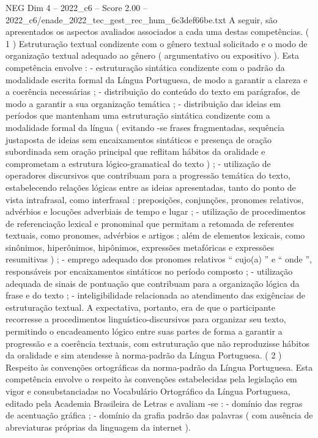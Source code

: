\begin{textsample}{NEG Dim 4 – 2022\_c6 – Score 2.00 – 2022\_c6/enade\_2022\_tec\_gest\_rec\_hum\_6c3def66be.txt}
A seguir, são apresentados os aspectos avaliados associados a cada uma destas competências. ( 1 ) Estruturação textual condizente com o gênero textual solicitado e o modo de organização textual adequado ao gênero ( argumentativo ou expositivo ).
Esta competência envolve : - estruturação sintática condizente com o padrão da modalidade escrita formal da Língua Portuguesa, de modo a garantir a clareza e a coerência necessárias ; - distribuição do conteúdo do texto em parágrafos, de modo a garantir a sua organização temática ; - distribuição das ideias em períodos que mantenham uma estruturação sintática condizente com a modalidade formal da língua ( evitando -se frases fragmentadas, sequência justaposta de ideias sem encaixamentos sintáticos e presença de oração subordinada sem oração principal que reflitam hábitos da oralidade e comprometam a estrutura lógico-gramatical do texto ) ; - utilização de operadores discursivos que contribuam para a progressão temática do texto, estabelecendo relações lógicas entre as ideias apresentadas, tanto do ponto de vista intrafrasal, como interfrasal : preposições, conjunções, pronomes relativos, advérbios e locuções adverbiais de tempo e lugar ; - utilização de procedimentos de referenciação lexical e pronominal que permitam a retomada de referentes textuais, como pronomes, advérbios e artigos ; além de elementos lexicais, como sinônimos, hiperônimos, hipônimos, expressões metafóricas e expressões resumitivas ) ; - emprego adequado dos pronomes relativos “ cujo(a) ” e “ onde ”, responsáveis por encaixamentos sintáticos no período composto ; - utilização adequada de sinais de pontuação que contribuam para a organização lógica da frase e do texto ; - inteligibilidade relacionada ao atendimento das exigências de estruturação textual.
A expectativa, portanto, era de que o participante recorresse a procedimentos linguístico-discursivos para organizar seu texto, permitindo o encadeamento lógico entre suas partes de forma a garantir a progressão e a coerência textuais, com estruturação que não reproduzisse hábitos da oralidade e sim atendesse à norma-padrão da Língua Portuguesa. ( 2 ) Respeito às convenções ortográficas da norma-padrão da Língua Portuguesa.
Esta competência envolve o respeito às convenções estabelecidas pela legislação em vigor e consubstanciadas no Vocabulário Ortográfico da Língua Portuguesa, editado pela Academia Brasileira de Letras e avaliam -se : - domínio das regras de acentuação gráfica ; - domínio da grafia padrão das palavras ( com ausência de abreviaturas próprias da linguagem da internet ).

\end{textsample}
